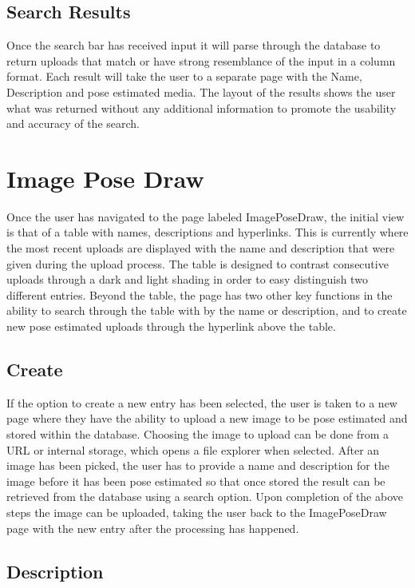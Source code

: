 \documentclass{scrreprt}
\begin{document}
\subsection{Search Results}

Once the search bar has received input it will parse through the database to
return uploads that match or have strong resemblance of the input in a column
format. Each result will take the user to a separate page with the Name,
Description and pose estimated media. The layout of the results shows the user
what was returned without any additional information to promote the usability
and accuracy of the search.

\section{Image Pose Draw}

Once the user has navigated to the page labeled ImagePoseDraw, the initial view
is that of a table with names, descriptions and hyperlinks. This is currently
where the most recent uploads are displayed with the name and description that
were given during the upload process. The table is designed to contrast
consecutive uploads through a dark and light shading in order to easy
distinguish two different entries. Beyond the table, the page has two other key
functions in the ability to search through the table with by the name or
description, and to create new pose estimated uploads through the hyperlink
above the table.

\subsection{Create}

If the option to create a new entry has been selected, the user is taken to a
new page where they have the ability to upload a new image to be pose estimated
and stored within the database. Choosing the image to upload can be done from a
URL or internal storage, which opens a file explorer when selected. After an
image has been picked, the user has to provide a name and description for the
image before it has been pose estimated so that once stored the result can be
retrieved from the database using a search option. Upon completion of the above
steps the image can be uploaded, taking the user back to the ImagePoseDraw page
with the new entry after the processing has happened.

\subsection{Description}
\end{document}
